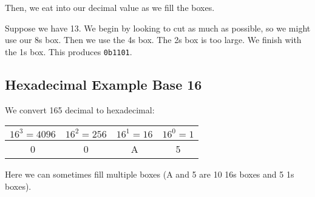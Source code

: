 \documentclass[12pt]{article}
\begin{document}
Then, we eat into our decimal value as we fill the boxes.

Suppose we have 13. We begin by looking to cut as much as possible, so we might use our 8s box. Then we use the 4s box. The 2s box is too large. We finish with the 1s box. This produces \texttt{0b1101}.

\subsection*{Hexadecimal Example {Base 16}}

We convert 165 decimal to hexadecimal:

\begin{center}
\begin{tabular}{|c|c|c|c|}
    \hline
    $16^3=4096$ & $16^2=256$ & $16^1=16$ & $16^0=1$ \\
    \hline
    0 & 0 & A & 5 \\
    \hline
\end{tabular}
\end{center}

Here we can sometimes fill multiple boxes (A and 5 are 10 16s boxes and 5 1s boxes).
\end{document}
